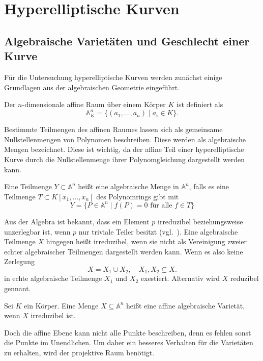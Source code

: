 \chapter{Hyperelliptische Kurven}

\section{Algebraische Varietäten und Geschlecht einer Kurve}
Für die Untersuchung hyperelliptische Kurven werden zunächst einige Grundlagen aus der algebraischen Geometrie eingeführt.

\begin{definition}
  Der $n$-dimensionale affine Raum über einem Körper $K$ ist definiert als
  \[
    \mathbb{A}_K^n=\{(a_1,\dots,a_n)\mid a_i\in K\}.
  \]
\end{definition}
\cite[S.38]{Clader25}
Bestimmte Teilmengen des affinen Raumes lassen sich als gemeinsame Nullstellenmengen von Polynomen beschreiben. Diese werden als algebraische Mengen bezeichnet. Diese ist wichtig, da der affine Teil einer hyperelliptische Kurve durch die Nullstellenmenge ihrer Polynomgleichung dargestellt werden kann.
\begin{definition}
  Eine Teilmenge $Y\subset \mathbb{A}^n$ heißt eine algebraische Menge in $\mathbb{A}^n$, falls es eine Teilmenge $T\subset K[x_1,\dots,x_n]$ des Polynomrings gibt mit
  \[
    Y=\{P\in \mathbb{A}^n\mid f(P)=0 \text{ für alle }f \in T\}
  \]
\end{definition}
\cite[S.2--3]{Hulek12}
Aus der Algebra ist bekannt, dass ein Element $p$ irreduzibel beziehungsweise unzerlegbar ist, wenn $p$ nur triviale Teiler besitzt (vgl.~\cite[S.245--246]{Karpf24}). Eine algebraische Teilmenge $X$ hingegen heißt irreduzibel, wenn sie nicht als Vereinigung zweier echter algebraischer Teilmengen dargestellt werden kann. Wenn es also keine Zerlegung
\[
  X=X_1\cup X_2,\quad X_1,X_2\subsetneq X.
\]
in echte algebraische Teilmenge $X_1$ und $X_2$ exestiert. Alternativ wird $X$ reduzibel gennant.
\cite[S.18]{Hulek12}
\begin{definition}
  Sei $K$ ein Körper. Eine Menge $X\subseteq\mathbb{A}^n$ heißt eine affine algebraische Varietät, wenn $X$ irreduzibel ist.
\end{definition}
\cite[S.39,43]{Clader25}
Doch die affine Ebene kann nicht alle Punkte beschreiben, denn es fehlen sonst die Punkte im Unendlichen. Um daher ein besseres Verhalten für die Varietäten zu erhalten, wird der projektive Raum benötigt.
